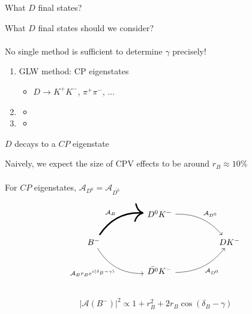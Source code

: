 \documentclass[dvipsnames]{beamer}
\begin{document}
\begin{frame}{What $D$ final states?}
  \begin{center}
    \Large What $D$ final states should we consider?\\~\\
    \Large No single method is sufficient to determine $\gamma$ precisely!
  \end{center}
  \vspace{0.2cm}
  \begin{enumerate}
    \setlength\itemsep{1.0em}
    \item{GLW method: CP eigenstates}
    \begin{itemize}
      \item{$D\to K^+K^-$, $\pi^+\pi^-$, ...}
    \end{itemize}
    \item{\phantom{ADS method: Doubly-Cabibbo Suppressed decays}}
    \begin{itemize}
      \item[]{\phantom{$D\to K^-\pi^+$, $K^-\pi^+\pi^-\pi^+$, ...}}
    \end{itemize}
    \item{\phantom{BPGGSZ method: Multi-body final states}}
    \begin{itemize}
      \item[]{\phantom{$D\to K_S^0\pi^+\pi^-$, $K_S^0K^+K^-$, ...}}
    \end{itemize}
  \end{enumerate}
\end{frame}

\begin{frame}[fragile]{$D$ decays to a $C\!P$ eigenstate}
  \begin{center}
    Naively, we expect the size of CPV effects to be around $r_B\approx10\%$\\~\\
    For $C\!P$ eigenstates, $\mathcal{A}_{D^0} = \mathcal{A}_{\bar{D^0}}$
  \end{center}
  \begin{equation*}
    \begin{tikzcd}[column sep=huge]
      & D^0K^- \arrow[dr, bend left = 25, "\mathcal{A}_{D^0}"] & \\
      B^- \arrow[ur, bend left, line width = 1.7, "\mathcal{A}_B"] \arrow[dr, bend right, "\mathcal{A}_B r_B e^{i(\delta_B - \gamma)}"'] & [5cm] & DK^- \\
      & \bar{D^0}K^- \arrow[ur, bend right = 25, "\mathcal{A}_{D^0}"'] & \\
    \end{tikzcd}
  \end{equation*}
  \begin{equation*}
    \lvert\mathcal{A}(B^-)\lvert^2\propto1 + r_B^2 + 2r_B\cos(\delta_B - \gamma)
  \end{equation*}
\end{frame}
\end{document}

